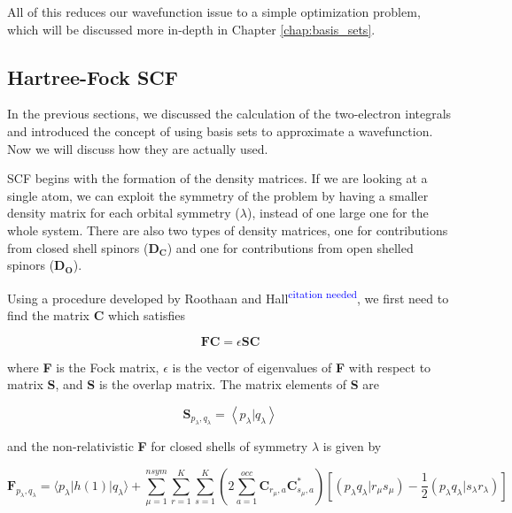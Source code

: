\documentclass[12pt]{report}
\newcommand{\citethis}{\textsuperscript{\textcolor{blue}{citation needed}}} %
\begin{document}
All of this reduces our wavefunction issue to a simple optimization problem, which will be discussed more in-depth in Chapter \ref{chap:basis_sets}.

\subsection{Hartree-Fock SCF}
In the previous sections, we discussed the calculation of the two-electron integrals and introduced the concept of using basis sets to approximate a wavefunction. Now we will discuss how they are actually used. 

SCF begins with the formation of the density matrices. If we are looking at a single atom, we can exploit the symmetry of the problem by having a smaller density matrix for each orbital symmetry ($\lambda$), instead of one large one for the whole system. There are also two types of density matrices, one for contributions from closed shell spinors (\textbf{D$_\textbf{C}$}) and one for contributions from open shelled spinors (\textbf{D$_\textbf{O}$}).

Using a procedure developed by Roothaan and Hall\citethis{}, we first need to find the matrix \textbf{C} which satisfies 

\begin{equation}
\label{RHE}
\textbf{FC} = \epsilon{}\textbf{SC}
\end{equation}

where \textbf{F} is the Fock matrix, $\epsilon$ is the vector of eigenvalues of \textbf{F} with respect to matrix \textbf{S}, and \textbf{S} is the overlap matrix. The matrix elements of \textbf{S} are

\begin{equation}
\label{eq:smat}
\textbf{S}_{p_{\lambda}, q_{\lambda}} = \left<p_{\lambda}|q_{\lambda}\right>
\end{equation}

and the non-relativistic \textbf{F} for closed shells of symmetry $\lambda$ is given by

\begin{equation}
\label{FOCKM}
\textbf{F}_{p_{\lambda},q_{\lambda}} = \langle p_{\lambda}|h(1)|q_{\lambda}\rangle + \sum^{nsym}_{\mu=1}\sum^{K}_{r=1}\sum^{K}_{s=1}\left( 2\sum^{occ}_{a=1}\textbf{C}_{r_{\mu},a}\textbf{C}^{*}_{s_{\mu}, a}\right)
				\left[\left( p_{\lambda}q_{\lambda}|r_{\mu}s_{\mu}\right) - \frac{1}{2}\left( p_{\lambda}q_{\lambda}|s_{\lambda}r_{\lambda}\right)\right]
\end{equation}
\end{document}

